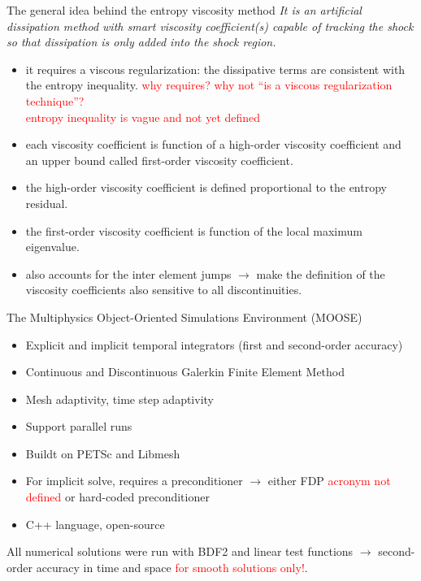 \documentclass[xcolor=dvipsnames,10pt]{beamer}
\newcommand{\tcr}[1]{\textcolor{red}{#1}}
\begin{document}
\begin{frame}{The general idea behind the entropy viscosity method}
\emph{It is an artificial dissipation method with smart viscosity coefficient(s)  capable of tracking the shock so that dissipation is only added into the shock region.}
\begin{block}{}
\begin{itemize}
\setlength{\itemsep}{10pt}
\item it requires a viscous regularization: the dissipative terms are consistent with the entropy inequality. \tcr{why requires? why not ``is a viscous regularization technique''?\\} \tcr{entropy inequality is vague and not yet defined}
\item each viscosity coefficient is function of a high-order viscosity coefficient and an upper bound called first-order viscosity coefficient.
\item the high-order viscosity coefficient is defined proportional to the entropy residual.
\item the first-order viscosity coefficient is function of the local maximum eigenvalue.
\item also accounts for the inter element jumps $\to$ make the definition of the viscosity coefficients also sensitive to all discontinuities. 
\end{itemize}
\end{block}
\end{frame}
\begin{frame}{The Multiphysics Object-Oriented Simulations Environment (MOOSE)}
\begin{block}{}
\begin{itemize}
\setlength{\itemsep}{10pt}
\item Explicit and implicit temporal integrators (first and second-order accuracy)
\item Continuous and Discontinuous Galerkin Finite Element Method
\item Mesh adaptivity, time step adaptivity
\item Support parallel runs
\item Buildt on PETSc and Libmesh
\item For implicit solve, requires a preconditioner $\to$ either FDP \tcr{acronym not defined} or hard-coded preconditioner
\item C++ language, open-source
\end{itemize}
\end{block}
\begin{block}{}
All numerical solutions were run with BDF2 and linear test functions $\to$ second-order accuracy in time and space \tcr{for smooth solutions only!}.
\end{block}
\end{frame}
\end{document}
